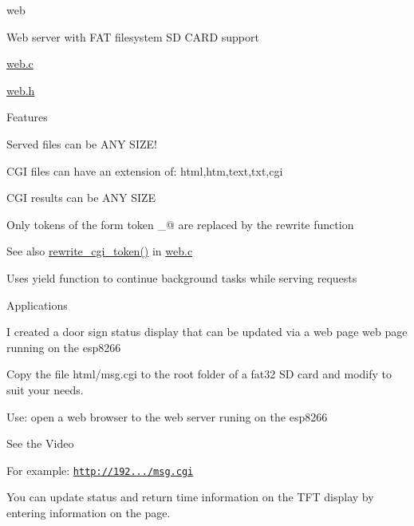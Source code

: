 web
\begin{DoxyItemize}
\item Web server with F\+AT filesystem SD C\+A\+RD support
\begin{DoxyItemize}
\item \hyperlink{web_8c}{web.\+c}
\item \hyperlink{web_8h}{web.\+h}
\end{DoxyItemize}
\item Features
\begin{DoxyItemize}
\item Served files can be A\+NY S\+I\+Z\+E!
\item C\+GI files can have an extension of\+: html,htm,text,txt,cgi
\begin{DoxyItemize}
\item C\+GI results can be A\+NY S\+I\+ZE
\end{DoxyItemize}
\item Only tokens of the form  token \+\_\+@ are replaced by the rewrite function
\begin{DoxyItemize}
\item \begin{DoxySeeAlso}{See also}
\hyperlink{web_8c_abfb5be0ab21dfe56bc934a8965154384}{rewrite\+\_\+cgi\+\_\+token()} in \hyperlink{web_8c}{web.\+c}
\end{DoxySeeAlso}

\end{DoxyItemize}
\item Uses yield function to continue background tasks while serving requests
\end{DoxyItemize}
\item Applications
\begin{DoxyItemize}
\item I created a door sign status display that can be updated via a web page web page running on the esp8266
\begin{DoxyItemize}
\item Copy the file html/msg.\+cgi to the root folder of a fat32 SD card and modify to suit your needs.
\item Use\+: open a web browser to the web server runing on the esp8266
\begin{DoxyItemize}
\item See the Video
\item For example\+: \href{http://192.168.200.116/msg.cgi}{\tt http\+://192.../msg.\+cgi}
\item You can update status and return time information on the T\+FT display by entering information on the page.
\end{DoxyItemize}
\end{DoxyItemize}
\end{DoxyItemize}
\end{DoxyItemize}

